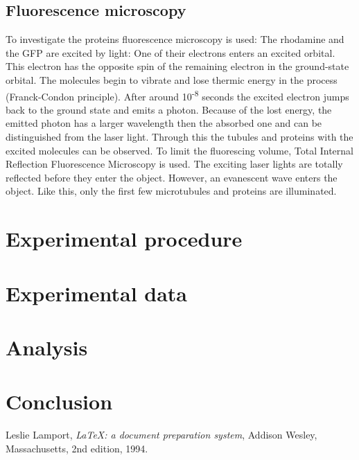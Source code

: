 \documentclass[english, %
parskip=full, %
bibliography=totoc, %
draft, %
]{scrartcl}
\begin{document}
\subsection{Fluorescence microscopy}

To investigate the proteins fluorescence microscopy is used: The rhodamine and the GFP are excited by light: One of their electrons enters an excited orbital. This electron has the opposite spin of the remaining electron in the ground-state orbital. The molecules begin to vibrate and lose thermic energy in the process (Franck-Condon principle). After around 10\textsuperscript{-8} seconds the excited electron jumps back to the ground state and emits a photon. Because of the lost energy, the emitted photon has a larger wavelength then the absorbed one and can be distinguished from the laser light. Through this the tubules and proteins with the excited molecules can be observed. 
To limit the fluorescing volume, Total Internal Reflection Fluorescence Microscopy is used. The exciting laser lights are totally reflected before they enter the object. However, an evanescent wave enters the object.  Like this, only the first few microtubules and proteins are illuminated.


\section{Experimental procedure}

\section{Experimental data}

\section{Analysis}

\section{Conclusion}


\begin{thebibliography}{9}

  Leslie Lamport,
  \emph{\LaTeX: a document preparation system},
  Addison Wesley, Massachusetts,
  2nd edition,
  1994.

\end{thebibliography}
\end{document}
